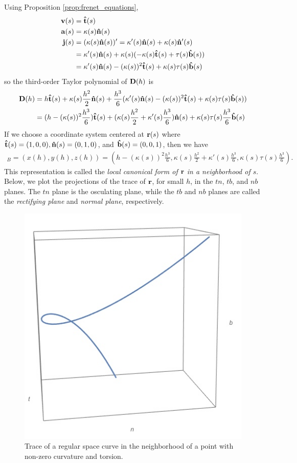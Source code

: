 \documentclass[12pt,letterpaper,reqno]{article}
\numberwithin{equation}{section}
\newcommand{\bv}{{\bf v}}
\newcommand{\ba}{{\bf a}}
\newcommand{\bbr}{{\bf r}}
\newcommand{\ut}{{\bf {\hat{t}}}}
\newcommand{\un}{{\bf {\hat{n}}}}
\newcommand{\ub}{{\bf {\hat{b}}}}
\newcommand{\bj}{{\bf j}}
\begin{document}
{Using Proposition \ref{prop:frenet_equations},
\begin{align*}
    \bv(s)&=\ut(s) \\
    \ba(s)&=\kappa(s) \un(s) \\
    \bj(s)&=(\kappa(s) \un(s))'=\kappa'(s)\un(s) + \kappa(s) \un'(s) \\
    &= \kappa'(s)\un(s) + \kappa(s)(-\kappa(s)\ut(s)+\tau(s) \ub(s)) \\
    &=\kappa'(s)\un(s)-(\kappa(s))^2\ut(s) +\kappa(s) \tau(s) \ub(s) 
\end{align*}
so the third-order Taylor polynomial of ${\bf D}(h)$ is
\begin{align*}
    {\bf D}(h)&=h\ut(s)+\kappa(s) \frac{h^2}{2}\un(s)+\frac{h^3}{6}(\kappa'(s)\un(s)-(\kappa(s))^2\ut(s) +\kappa(s) \tau(s) \ub(s)) \\
    &=(h-(\kappa(s))^2\frac{h^3}{6})\ut(s)+(\kappa(s)\frac{h^2}{2}+\kappa'(s)\frac{h^3}{6})\un(s)+\kappa(s)\tau(s)\frac{h^3}{6}\ub(s)
\end{align*}
If we choose a coordinate system centered at $\bbr(s)$ where $\ut(s)=(1,0,0),  \un(s)=(0,1,0)$, and $\ub(s)=(0,0,1)$, then we have 
\begin{align*}
	[{\bf D}(h)]_B=(x(h),y(h),z(h))=\left(h-(\kappa(s))^2\frac{h^3}{6},\kappa(s)\frac{h^2}{2}+\kappa'(s)\frac{h^3}{6},\kappa(s)\tau(s)\frac{h^3}{6}\right).
\end{align*} 
This representation is called the \emph{local canonical form of $\bbr$ in a neighborhood of $s$}. Below, we plot the projections of the trace of $\bbr$, for small $h$, in the $tn$, $tb$, and $nb$ planes. The $tn$ plane is the osculating plane, while the $tb$ and $nb$ planes are called the \emph{rectifying plane} and \emph{normal plane}, respectively.

\begin{figure}[h]
	\begin{center}
		\includegraphics[scale=0.25]{figures_mvc/local_canonical_form}
	\end{center}
	\caption{Trace of a regular space curve in the neighborhood of a point with non-zero curvature and torsion.}
\end{figure}

}
\end{document}

